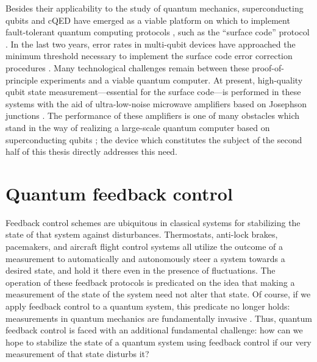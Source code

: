 Besides their applicability to the study of quantum mechanics, superconducting qubits and cQED have emerged as a viable platform on which to implement fault-tolerant quantum computing protocols \cite{Nielsen2000}, such as the ``surface code'' protocol \cite{PhysRevA.86.032324}.  In the last two years, error rates in multi-qubit devices have approached the minimum threshold necessary to implement the surface code error correction procedures \cite{Barends2014,Riste2014,Chow2014}.  Many technological challenges remain between these proof-of-principle experiments and a viable quantum computer.  At present, high-quality qubit state measurement---essential for the surface code---is performed in these systems with the aid of ultra-low-noise microwave amplifiers based on Josephson junctions \cite{Castellanos-Beltran2008,JPCNature,Hatridge:2011zr}.  The performance of these amplifiers is one of many obstacles which stand in the way of realizing a large-scale quantum computer based on superconducting qubits \cite{Mutus2014,Kelly2015}; the device which constitutes the subject of the second half of this thesis directly addresses this need.

\section{Quantum feedback control}

Feedback control schemes are ubiquitous in classical systems for stabilizing the state of that system against disturbances.  Thermostats, anti-lock brakes, pacemakers, and aircraft flight control systems all utilize the outcome of a measurement to automatically and autonomously steer a system towards a desired state, and hold it there even in the presence of fluctuations.  The operation of these feedback protocols is predicated on the idea that making a measurement of the state of the system need not alter that state.  Of course, if we apply feedback control to a quantum system, this predicate no longer holds: measurements in quantum mechanics are fundamentally invasive \cite{qmcontrol_book}. Thus, quantum feedback control is faced with an additional fundamental challenge: how can we hope to stabilize the state of a quantum system using feedback control if our very measurement of that state disturbs it?

